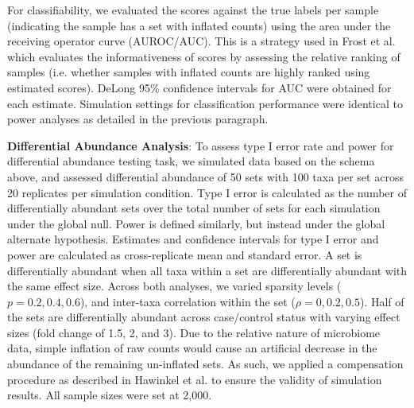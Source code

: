 \documentclass[10pt,letterpaper]{article}
\begin{document}
For classifiability, we evaluated the scores against the true labels per sample (indicating the sample has a set with inflated counts) using the area under the receiving operator curve (AUROC/AUC). This is a strategy used in Frost et al. \cite{frost2020a} which evaluates the informativeness of scores by assessing the relative ranking of samples (i.e. whether samples with inflated counts are highly ranked using estimated scores).  DeLong 95\% confidence intervals for AUC \cite{delong1988} were obtained for each estimate. Simulation settings for classification performance were identical to power analyses as detailed in the previous paragraph. 

\noindent \textbf{Differential Abundance Analysis}: To assess type I error rate and power for differential abundance testing task, we simulated data based on the schema above, and assessed differential abundance of 50 sets with 100 taxa per set across 20 replicates per simulation condition. Type I error is calculated as the number of differentially abundant sets over the total number of sets for each simulation under the global null. Power is defined similarly, but instead under the global alternate hypothesis. Estimates and confidence intervals for type I error and power are calculated as cross-replicate mean and standard error. A set is differentially abundant when all taxa within a set are differentially abundant with the same effect size. Across both analyses, we varied sparsity levels ($p = 0.2, 0.4, 0.6$), and inter-taxa correlation within the set ($\rho = 0, 0.2, 0.5$). Half of the sets are differentially abundant across case/control status with varying effect sizes (fold change of 1.5, 2, and 3). Due to the relative nature of microbiome data, simple inflation of raw counts would cause an artificial decrease in the abundance of the remaining un-inflated sets. As such, we applied a compensation procedure as described in Hawinkel et al. \cite{hawinkel2019} to ensure the validity of simulation results. All sample sizes were set at 2,000.    
\end{document}
